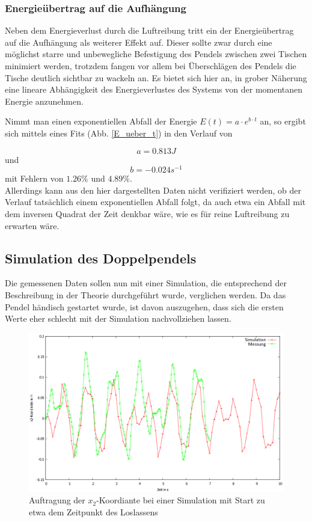 \subsubsection{Energieübertrag auf die Aufhängung}
Neben dem Energieverlust durch die Luftreibung tritt ein der Energieübertrag auf die Aufhängung als weiterer Effekt auf. Dieser sollte zwar durch eine möglichst starre und unbewegliche Befestigung des Pendels zwischen zwei Tischen minimiert werden, trotzdem fangen vor allem bei Überschlägen des Pendels die Tische deutlich sichtbar zu wackeln an. 
Es bietet sich hier an, in grober Näherung eine lineare Abhängigkeit des Energieverlustes des Systems von der momentanen Energie anzunehmen. 

Nimmt man einen exponentiellen Abfall der Energie $ E(t) = a \cdot e^{b \cdot t} $ an, so ergibt sich mittels eines Fits (Abb. \ref{E_ueber_t}) in den Verlauf von 

\begin{equation}
 a = 0.813   J
\nonumber
\end{equation}  und  
\begin{equation}
b = -0.024  s^{-1}
\nonumber
\end{equation} 
mit Fehlern von $1.26 \% $ und $ 4.89 \% $. \\
Allerdings kann aus den hier dargestellten Daten nicht verifiziert werden, ob der Verlauf tatsächlich einem exponentiellen Abfall folgt, da auch etwa ein Abfall mit dem inversen Quadrat der Zeit denkbar wäre, wie es für reine Luftreibung zu erwarten wäre. 

\subsection{Simulation des Doppelpendels}
Die gemessenen Daten sollen nun mit einer Simulation, die entsprechend der Beschreibung in der Theorie durchgeführt wurde, verglichen werden. Da das Pendel händisch gestartet wurde, ist davon auszugehen, dass sich die ersten Werte eher schlecht mit der Simulation nachvollziehen lassen. 


\begin{figure}
        \includegraphics[width=.9\textwidth]{images/x2_ueber_t_beginn_neu.png}
\caption{Auftragung der $x_2$-Koordiante bei einer Simulation mit Start zu etwa dem Zeitpunkt des Loslassens}
\label{x2_ueber_t_alt}
\end{figure}


